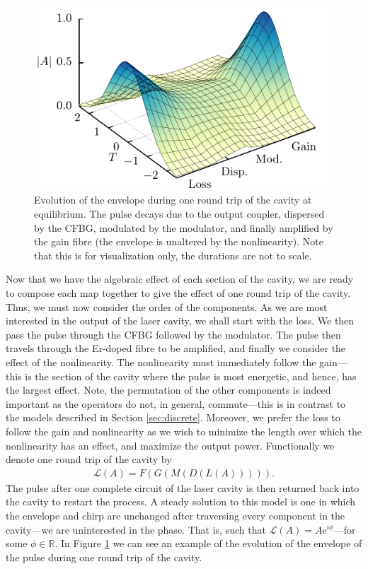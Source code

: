 \documentclass[10pt,twocolumn,a4paper]{article}
\begin{document}
\begin{figure}[tbp]
	\centering
	\includegraphics{Evo}
	\caption{Evolution of the envelope during one round trip of the cavity at equilibrium. The pulse decays due to the output coupler, dispersed by the CFBG, modulated by the modulator, and finally amplified by the gain fibre (the envelope is unaltered by the nonlinearity). Note that this is for visualization only, the durations are not to scale.}
	\label{fig:cavityevo}
\end{figure}

Now that we have the algebraic effect of each section of the cavity, we are ready to compose each map together to give the effect of one round trip of the cavity. Thus, we must now consider the order of the components. As we are most interested in the output of the laser cavity, we shall start with the loss. We then pass the pulse through the CFBG followed by the modulator. The pulse then travels through the Er-doped fibre to be amplified, and finally we consider the effect of the nonlinearity. The nonlinearity must immediately follow the gain---this is the section of the cavity where the pulse is most energetic, and hence, has the largest effect. Note, the permutation of the other components is indeed important as the operators do not, in general, commute---this is in contrast to the models described in Section \ref{sec:discrete}. Moreover, we prefer the loss to follow the gain and nonlinearity as we wish to minimize the length over which the nonlinearity has an effect, and maximize the output power. Functionally we denote one round trip of the cavity by
\begin{align}
	\mathcal{L}(A) = F(G(M(D(L(A))))).
\end{align}
 The pulse after one complete circuit of the laser cavity is then returned back into the cavity to restart the process. A steady solution to this model is one in which the envelope and chirp are unchanged after traversing every component in the cavity---we are uninterested in the phase. That is, such that $\mathcal{L}(A) = A \textrm{e}^{i \phi}$---for some $\phi \in \mathbb{R}$. In Figure \ref{fig:cavityevo} we can see an example of the evolution of the envelope of the pulse during one round trip of the cavity.
\end{document}
